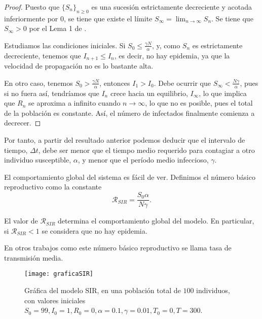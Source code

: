 \begin{proof}

Puesto que $\{S_n\}_{n\geq 0}$ es una sucesión estrictamente decreciente y acotada inferiormente por $0$, se tiene que existe el límite $\displaystyle S_\infty = \lim_{n \rightarrow \infty} S_n$. Se tiene que $S_\infty > 0$ por el Lema 1 de \cite{allenDiscretetimeSISIR1994}.

Estudiamos las condiciones iniciales. Si $S_0\leq \frac{\gamma N}{\alpha}$, y, como $S_n$ es estrictamente decreciente, tenemos que $I_{n+1}\leq I_n$, es decir, no hay epidemia, ya que la velocidad de propagación no es lo bastante alta.

En otro caso, tenemos $S_0> \frac{\gamma N}{\alpha}$, entonces $I_1>I_0$. Debe ocurrir que $S_\infty <\frac{N\gamma}{\alpha}$, pues si no fuera así, tendríamos que $I_n$ crece hacia un equilibrio, $I_\infty$, lo que implica que $R_n$ se aproxima a infinito cuando $n\rightarrow\infty$, lo que no es posible, pues el total de la población es constante. Así, el número de infectados finalmente comienza a decrecer.
\end{proof}

Por tanto, a partir del resultado anterior podemos deducir que el intervalo de tiempo, $\Delta t$, debe ser menor que el tiempo medio requerido para contagiar a otro individuo susceptible, $\alpha$, y menor que el período medio infeccioso, $\gamma$.


El comportamiento global del sistema es fácil de ver. Definimos el número básico reproductivo como la constante 
$$\mathcal{R}_{SIR}=\frac{S_0 \alpha}{N\gamma }.$$

El valor de $\mathcal{R}_{SIR}$ determina el comportamiento global del modelo. En particular, si $\mathcal{R}_{SIR}<1$ se considera que no hay epidemia.

En otros trabajos como \cite{demongeotSIEpidemicModel} este número básico reproductivo se llama tasa de transmisión media.



\begin{figure}
\begin{center}
\caption{Gráfica del modelo SIR, en una población total de $100$ individuos, con valores iniciales $S_0=99, I_0 = 1, R_0 = 0, \alpha = 0.1, \gamma = 0.01, T_0 = 0, T = 300$.}
\texttt{[image: graficaSIR]}
\end{center}
\end{figure}

